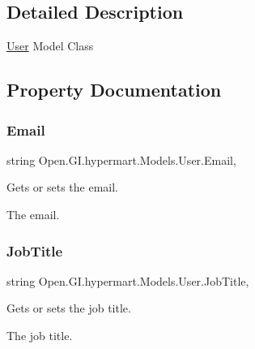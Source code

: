 \subsection{Detailed Description}
\hyperlink{class_open_1_1_g_i_1_1hypermart_1_1_models_1_1_user}{User} Model Class 



\subsection{Property Documentation}
\hypertarget{class_open_1_1_g_i_1_1hypermart_1_1_models_1_1_user_a7b16ff0fd873d16ef921cd94f89be6f5}{}\label{class_open_1_1_g_i_1_1hypermart_1_1_models_1_1_user_a7b16ff0fd873d16ef921cd94f89be6f5} 
\subsubsection{\texorpdfstring{Email}{Email}}
{\footnotesize\ttfamily string Open.\+G\+I.\+hypermart.\+Models.\+User.\+Email\hspace{0.3cm}{\ttfamily [get]}, {\ttfamily [set]}}



Gets or sets the email. 

The email. \hypertarget{class_open_1_1_g_i_1_1hypermart_1_1_models_1_1_user_ad0aa7cba72b233858607496eb693d149}{}\label{class_open_1_1_g_i_1_1hypermart_1_1_models_1_1_user_ad0aa7cba72b233858607496eb693d149} 
\subsubsection{\texorpdfstring{Job\+Title}{JobTitle}}
{\footnotesize\ttfamily string Open.\+G\+I.\+hypermart.\+Models.\+User.\+Job\+Title\hspace{0.3cm}{\ttfamily [get]}, {\ttfamily [set]}}



Gets or sets the job title. 

The job title. \hypertarget{class_open_1_1_g_i_1_1hypermart_1_1_models_1_1_user_a70e545515c09bf8fc7a646c8f1a883a2}{}\label{class_open_1_1_g_i_1_1hypermart_1_1_models_1_1_user_a70e545515c09bf8fc7a646c8f1a883a2} 
